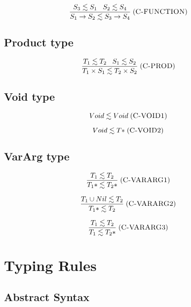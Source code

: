 \documentclass[12pt]{article}
\newcommand{\mylabel}[1]{\; (\textsc{#1})}
\begin{document}
\[
\frac{S_{3} \lesssim S_{1} \;\;\; S_{2} \lesssim S_{4}}
     {S_{1} \rightarrow S_{2} \lesssim S_{3} \rightarrow S_{4}}
\mylabel{C-FUNCTION}
\]

\subsection{Product type}

\[
\frac{T_{1} \lesssim T_{2} \;\;\; S_{1} \lesssim S_{2}}
     {T_{1} \times S_{1} \lesssim T_{2} \times S_{2}}
\mylabel{C-PROD}
\]

\subsection{Void type}

\[
Void \lesssim Void
\mylabel{C-VOID1}
\]

\[
Void \lesssim {T*}
\mylabel{C-VOID2}
\]

\subsection{VarArg type}

\[
\frac{T_{1} \lesssim T_{2}}
     {{T_{1}*} \lesssim {T_{2}*}}
\mylabel{C-VARARG1}
\]

\[
\frac{T_{1} \cup Nil \lesssim T_{2}}
     {{T_{1}*} \lesssim T_{2}}
\mylabel{C-VARARG2}
\]

\[
\frac{T_{1} \lesssim T_{2}}
     {T_{1} \lesssim {T_{2}*}}
\mylabel{C-VARARG3}
\]

%

\section{Typing Rules}

\subsection{Abstract Syntax}
\end{document}
